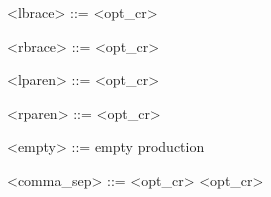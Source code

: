 \begin{grammar}
  <lbrace> ::= \tn{$\{$} <opt_cr>
\end{grammar}

\vs

\begin{grammar}
  <rbrace> ::= <opt_cr> \tn{$\}$}
\end{grammar}

\vs

\begin{grammar}
  <lparen> ::= \tn{(} <opt_cr>
\end{grammar}

\vs

\begin{grammar}
  <rparen> ::= <opt_cr> \tn{)}
\end{grammar}

\vs

\begin{grammar}
  <empty> ::= empty production
\end{grammar}

\vs

\begin{grammar}
  <comma_sep> ::= <opt_cr> \tn{,} <opt_cr>
\end{grammar}






